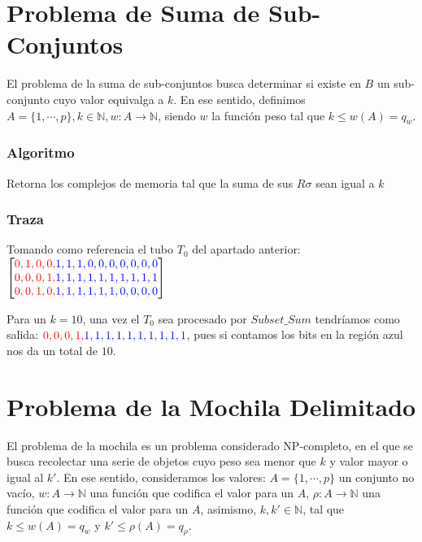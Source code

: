 \documentclass[12pt, letterpaper, twoside]{article}
\begin{document}
    \section{Problema de Suma de Sub-Conjuntos}
    \par El problema de la suma de sub-conjuntos busca determinar si existe en $B$ un sub-conjunto cuyo valor equivalga a $k$. En ese sentido, definimos $A=\{1,\cdots,p\}, k\in\mathbb{N}, w:A\rightarrow\mathbb{N}$, siendo $w$ la función peso tal que $k\leq w(A)=q_w$.
    \subsubsection{Algoritmo}
    \begin{algorithm}
        \caption{Retorna los complejos de memoria tal que la suma de sus $R\sigma$ sean igual a $k$}
        \label{SubsetSum}
        \begin{algorithmic}[1]
            \EndProcedure
        \end{algorithmic}
    \end{algorithm}
    \subsubsection{Traza}
    \par Tomando como referencia el tubo $T_0$ del apartado anterior: \\
    $
        \begin{bmatrix}
            \textcolor{red}{0, 1, 0, 0,} \textcolor{blue}{1, 1, 1, 0, 0, 0, 0, 0, 0, 0} \\
            \textcolor{red}{0, 0, 0, 1,} \textcolor{blue}{1, 1, 1, 1, 1, 1, 1, 1, 1, 1} \\
            \textcolor{red}{0, 0, 1, 0,} \textcolor{blue}{1, 1, 1, 1, 1, 1, 0, 0, 0, 0}
        \end{bmatrix}
    $
    \par Para un $k=10$, una vez el $T_0$ sea procesado por $Subset\_Sum$ tendríamos como salida: $\textcolor{red}{0, 0, 0, 1,} \textcolor{blue}{1, 1, 1, 1, 1, 1, 1, 1, 1, 1}$, pues si contamos los bits en la región azul nos da un total de $10$.
    \section{Problema de la Mochila Delimitado}
    \par El problema de la mochila es un problema considerado NP-completo, en el que se busca recolectar una serie de objetos cuyo peso sea menor que $k$ y valor mayor o igual al $k'$. En ese sentido, consideramos los valores: $A=\{1,\cdots,p\}$ un conjunto no vacío, $w:A\rightarrow\mathbb{N}$ una función que codifica el valor para un $A$, $\rho:A\rightarrow\mathbb{N}$ una función que codifica el valor para un $A$, asimismo, $k,k'\in\mathbb{N}$, tal que $k\leq w(A)=q_w$ y $k'\leq \rho(A)=q_\rho$.
\end{document}
